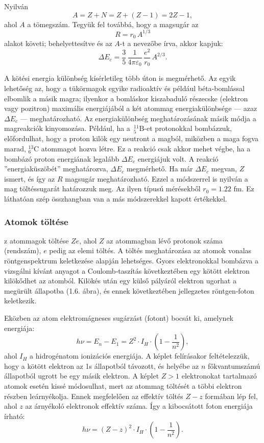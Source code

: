\documentclass[../main.tex]{subfiles}
\begin{document}
Nyilván
\begin{equation}
A = Z + N = Z + (Z-1) = 2Z-1,
\tag{1.12}
\end{equation}
ahol \(A\) a tömegszám. Tegyük fel továbbá, hogy a magsugár az
\[
R = r_0\,A^{1/3}
\]
alakot követi; behelyettesítve és az \(A\)-t a nevezőbe írva, akkor kapjuk:
\begin{equation}
\Delta E_c = \frac{3}{5}\,\frac{1}{4\pi\varepsilon_0}\,\frac{e^2}{r_0}\,A^{2/3}.
\tag{1.13}
\end{equation}

A kötési energia különbség kísérletileg több úton is megmérhető. Az egyik lehetőség az, hogy a tükörmagok egyike radioaktív és például béta‑bomlással elbomlik a másik magra; ilyenkor a bomláskor kiszabaduló részecske (elektron vagy pozitron) maximális energiájából a két atommag energiakülönbsége — azaz \(\Delta E_c\) — meghatározható. Az energiakülönbség meghatározásának másik módja a magreakciók kinyomozása. Például, ha a \(\,^{11}_5\mathrm{B}\)-et protonokkal bombázzuk, előfordulhat, hogy a proton kilök egy neutront a magból, miközben a maga fogva marad, $^{13}_6\mathrm{C}$ atommagot hozva létre.
Ez a reakció csak akkor mehet végbe, ha a bombázó proton energiának legalább $\Delta E_c$ energiájuk volt.
A reakció ”energiaküszöbét” meghatározva, $\Delta E_c$ megmérhető. Ha már $\Delta E_c$ megvan, $Z$ ismert, és így az $R$ magsugár
meghatározható. Ezzel a módszerrel is nyilván a mag töltéssugarát határozzuk meg.
Az ilyen típusú mérésekből $r_0 = 1.22 \text{ fm}$. Ez láthatóan szép összhangban van a más módszerekkel kapott értékekkel.

\subsubsection{Atomok töltése}
z atommagok töltése \(Ze\), ahol \(Z\) az atommagban lévő protonok száma (rendszám), \(e\) pedig az elemi töltés. A töltés meghatározása az atomok vonalas röntgenspektrum keletkezése alapján lehetséges. Gyors elektronokkal bombázva a vizsgálni kívánt anyagot a Coulomb‑taszítás következtében egy kötött elektron kilökődhet az atomból. Kilökés után egy külső pályáról elektron ugorhat a megürült állapotba (1.6. ábra), és ennek következtében jellegzetes röntgen‑foton keletkezik.

Eközben az atom elektromágneses sugárzást (fotont) bocsát ki, amelynek energiája:
\begin{equation}
h\nu = E_n - E_1 = Z^2\cdot I_H\cdot\left(1-\frac{1}{n^2}\right),
\tag{1.14}
\end{equation}
ahol \(I_H\) a hidrogénatom ionizációs energiája. A képlet felírásakor feltételezzük, hogy a kötött elektron az 1s állapotból távozott, és helyébe az \(n\) főkvantumszámú állapotból ugrott be egy másik elektron. A képlet \(Z>1\) elektronokat tartalmazó atomok esetén kissé módosulhat, mert az atommag töltését a többi elektron részben leárnyékolja. Ennek megfelelően az effektív töltés \(Z-z\) formában lép fel, ahol \(z\) az árnyékoló elektronok effektív száma. Így a kibocsátott foton energiája írható:
\begin{equation}
h\nu = (Z-z)^2\cdot I_H\cdot\left(1-\frac{1}{n^2}\right).
\tag{1.15}
\end{equation}
\end{document}
